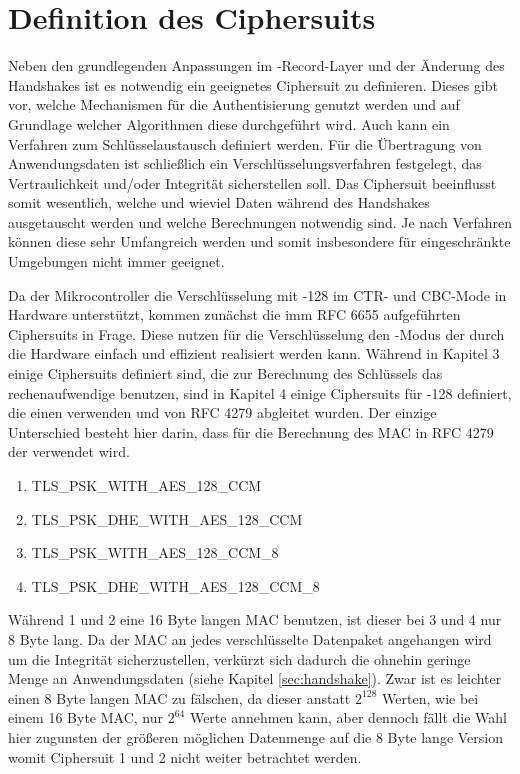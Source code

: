 \chapter{Definition des Ciphersuits}

Neben den grundlegenden Anpassungen im -Record-Layer und der Änderung des Handshakes ist es notwendig ein geeignetes Ciphersuit zu definieren.
Dieses gibt vor, welche Mechanismen für die Authentisierung genutzt werden und auf Grundlage welcher Algorithmen diese durchgeführt wird. Auch kann
ein Verfahren zum Schlüsselaustausch definiert werden. Für die Übertragung von Anwendungsdaten ist schließlich ein Verschlüsselungsverfahren festgelegt,
das Vertraulichkeit und/oder Integrität sicherstellen soll. Das Ciphersuit beeinflusst somit wesentlich, welche und wieviel Daten während des Handshakes
ausgetauscht werden und welche Berechnungen notwendig sind. Je nach Verfahren können diese sehr Umfangreich werden und somit insbesondere für eingeschränkte
Umgebungen nicht immer geeignet.

Da der Mikrocontroller die Verschlüsselung mit -128 im CTR- und CBC-Mode in Hardware unterstützt, kommen zunächst die imm RFC 6655 \cite{rfc6655}
aufgeführten Ciphersuits in Frage. Diese nutzen für die Verschlüsselung den -Modus der durch die Hardware einfach und effizient realisiert werden
kann. Während in Kapitel 3 einige Ciphersuits definiert sind, die zur Berechnung des Schlüssels das rechenaufwendige  benutzen, sind in Kapitel 4
einige Ciphersuits für -128 definiert, die einen  verwenden und von RFC 4279 \cite{rfc4279} abgleitet wurden. Der einzige Unterschied besteht
hier darin, dass für die Berechnung des MAC in RFC 4279 der  verwendet wird.
\begin{enumerate}
  \item TLS\_PSK\_WITH\_AES\_128\_CCM
  \item TLS\_PSK\_DHE\_WITH\_AES\_128\_CCM
  \item TLS\_PSK\_WITH\_AES\_128\_CCM\_8
  \item TLS\_PSK\_DHE\_WITH\_AES\_128\_CCM\_8
\end{enumerate}
Während 1 und 2 eine 16 Byte langen MAC benutzen, ist dieser bei 3 und 4 nur 8 Byte lang. Da der MAC an jedes verschlüsselte Datenpaket angehangen wird um die
Integrität sicherzustellen, verkürzt sich dadurch die ohnehin geringe Menge an Anwendungsdaten (siehe Kapitel \ref{sec:handshake}). Zwar ist es leichter
einen 8 Byte langen MAC zu fälschen, da dieser anstatt $ 2^128 $ Werten, wie bei einem 16 Byte MAC, nur $ 2^64 $ Werte annehmen kann, aber dennoch fällt die
Wahl hier zugunsten der größeren möglichen Datenmenge auf die 8 Byte lange Version womit Ciphersuit 1 und 2 nicht weiter betrachtet werden.

